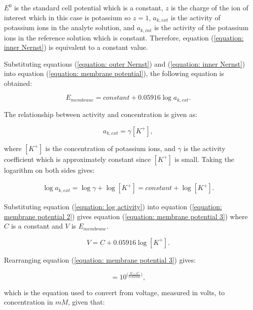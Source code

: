 \noindent $E^{0}$ is the standard cell potential which is a constant, $z$ is the charge of the ion of interest which in this case is potassium so $z=1$, $a_{k,ext}$ is the activity of potassium ions in the analyte solution, and $a_{k,int}$ is the activity of the potassium ions in the reference solution which is constant. Therefore, equation (\ref{equation: inner Nernst}) is equivalent to a constant value.

Substituting equations (\ref{equation: outer Nernst}) and (\ref{equation: inner Nernst}) into equation (\ref{equation: membrane potential}), the following equation is obtained:

\begin{equation}
    E_{membrane} = constant + 0.05916\log a_{k,ext}.
    \label{equation: membrane potential 2}
\end{equation}

The relationship between activity and concentration is given as:

\begin{equation}
    a_{k,ext} = \gamma [K^{+}],
    \label{equation: activity}
\end{equation}

\noindent where $[K^{+}]$ is the concentration of potassium ions, and $\gamma$ is the activity coefficient which is approximately constant since $[K^{+}]$ is small. Taking the logarithm on both sides gives:

\begin{align}
    \log a_{k,ext} = \log\gamma + \log [K^{+}] = constant + \log [K^{+}].
    \label{equation: log activity}
\end{align}

Substituting equation (\ref{equation: log activity}) into equation (\ref{equation: membrane potential 2}) gives equation (\ref{equation: membrane potential 3}) where $C$ is a constant and $V$ is $E_{membrane}$.

\begin{equation}
    V = C + 0.05916 \log [K^{+}].
    \label{equation: membrane potential 3}
\end{equation}

\noindent Rearranging equation (\ref{equation: membrane potential 3}) gives:

\begin{equation}
    [K^{+}] = 10^{\big(\frac{V-C}{0.05916}\big)},
    \label{equation: K+ calibration}
\end{equation}

\noindent which is the equation used to convert from voltage, measured in volts, to concentration in $mM$, given that:

